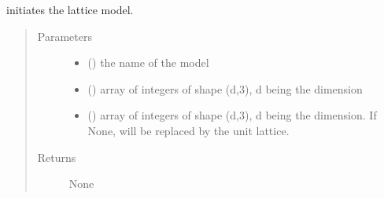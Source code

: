\documentclass[letterpaper,10pt,english]{sphinxmanual}
\begin{document}
\begin{fulllineitems}
\label{\detokenize{functions:pyqcm.lattice_model}}
\sphinxAtStartPar
initiates the lattice model.
\begin{quote}\begin{description}
\item[{Parameters}] \leavevmode\begin{itemize}
\item {} 
\sphinxAtStartPar
{} () \textendash{} the name of the model

\item {} 
\sphinxAtStartPar
{} (\sphinxstyleliteralemphasis{\sphinxupquote{{[}}}\sphinxstyleliteralemphasis{\sphinxupquote{{[}}}\sphinxstyleliteralemphasis{\sphinxupquote{{]}}}\sphinxstyleliteralemphasis{\sphinxupquote{{]}}}) \textendash{} array of integers of shape (d,3), d being the dimension

\item {} 
\sphinxAtStartPar
{} (\sphinxstyleliteralemphasis{\sphinxupquote{{[}}}\sphinxstyleliteralemphasis{\sphinxupquote{{[}}}\sphinxstyleliteralemphasis{\sphinxupquote{{]}}}\sphinxstyleliteralemphasis{\sphinxupquote{{]}}}) \textendash{} array of integers of shape (d,3), d being the dimension. If None, will be replaced by the unit lattice.

\end{itemize}

\item[{Returns}] \leavevmode
\sphinxAtStartPar
None

\end{description}\end{quote}

\end{fulllineitems}

\end{document}

